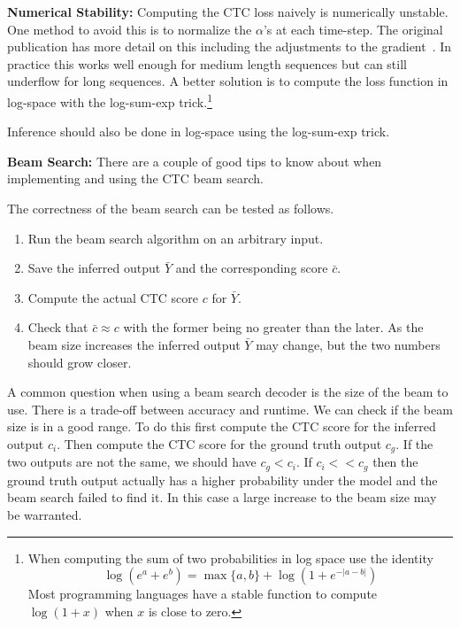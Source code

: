 {\bf Numerical Stability:} Computing the CTC loss naively is numerically
unstable. One method to avoid this is to normalize the $\alpha$’s at each
time-step. The original publication has more detail on this including the
adjustments to the gradient~\cite{graves2006}. In practice this works well
enough for medium length sequences but can still underflow for long sequences.
A better solution is to compute the loss function in log-space with the
log-sum-exp trick.\footnote{When computing the sum of two probabilities in log
space use the identity
\[
\log(e^a + e^b) = \max\{a, b\} + \log(1 + e^{-|a-b|})
\]
Most programming languages have a stable function to compute $\log(1 + x)$ when
$x$ is close to zero.}

Inference should also be done in log-space using the log-sum-exp trick.

{\bf Beam Search:} There are a couple of good tips to know about when
implementing and using the CTC beam search.

The correctness of the beam search can be tested as follows.
\begin{enumerate}
\item Run the beam search algorithm on an arbitrary input.
\item Save the inferred output $\bar{Y}$ and the corresponding score $\bar{c}$.
\item Compute the actual CTC score $c$ for $\bar{Y}$.
\item Check that $\bar{c} \approx c$ with the former being no greater than the
      later. As the beam size increases the inferred output $\bar{Y}$ may change,
      but the two numbers should grow closer.
\end{enumerate}

A common question when using a beam search decoder is the size of the beam to
use. There is a trade-off between accuracy and runtime. We can check if the
beam size is in a good range. To do this first compute the CTC score for the
inferred output $c_i$. Then compute the CTC score for the ground truth output
$c_g$. If the two outputs are not the same, we should have $c_g < c_i$. If $c_i
<< c_g$ then the ground truth output actually has a higher probability under
the model and the beam search failed to find it. In this case a large increase
to the beam size may be warranted.
